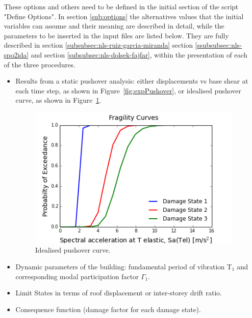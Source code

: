 These options and others need to be defined in the initial section of the script "Define Options". In section \ref{sub:options} the alternatives values that the initial variables can assume and their meaning are described in detail, while the parameters to be inserted in the input files are listed below. They are fully described in section \ref{subsubsec:nls-ruiz-garcia-miranda} section \ref{ssubsubsec:nls-spo2ida} and section  \ref{subsubsec:nls-dolsek-fajfar}, within the presentation of each of the three procedures.

\begin{itemize}
\item Results from a static pushover analysis: either displacements vs base shear at each time step, as shown in Figure~\ref{fig:expPushover}, or idealised pushover curve, as shown in Figure~\ref{fig:expIdealised}.



\begin{figure}[H]
\centering
\includegraphics{./figures/PushoverCurve.png}
\caption{Idealised pushover curve.}
\label{fig:expIdealised}
\end{figure}

\item Dynamic parameters of the building: fundamental period of vibration T$_1$ and corresponding modal participation factor $\Gamma_1$.
\item Limit States in terms of roof displacement or inter-storey drift ratio.
\item Consequence function (damage factor for each damage state).
\end{itemize}

